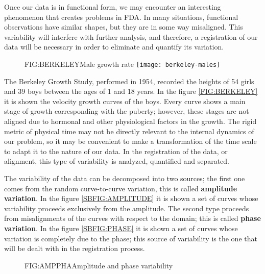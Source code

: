 Once our data is in functional form, we may encounter an interesting phenomenon
that creates problems in FDA. In many situations, functional observations have
similar shapes, but they are in some way misaligned. This variability will
interfere with further analysis, and therefore, a registration of our data will
be necessary in order to eliminate and quantify its variation.

\begin{figure}[Male growth rate]{FIG:BERKELEY}{Male growth rate}
	\texttt{[image: berkeley-males]}
\end{figure}

The Berkeley Growth Study\cite{berkeley}, performed in 1954, recorded the heights of 54
girls and 39 boys between the ages of 1 and 18 years. In the figure
\ref{FIG:BERKELEY} it is shown the velocity growth curves of the boys. Every curve shows a main stage of growth corresponding with the puberty;
however, these stages are not aligned due to hormonal and other
physiological factors in the growth. The rigid metric of physical time may not
be directly relevant to the internal dynamics of our problem, so it may be
convenient to make a transformation of the time scale to adapt it to the nature
of our data. In the registration of the data, or alignment, this type of
variability is analyzed, quantified and separated.



The variability of the data can be decomposed into two sources; the first one
comes from the random curve-to-curve variation\cite{Kokoszka2017}, this is called
\textbf{amplitude variation}. In the figure \ref{SBFIG:AMPLITUDE} it is shown a
set of curves whose variability proceeds exclusively from the amplitude. The
second type proceeds from misalignments of the curves with respect to the
domain; this is called \textbf{phase variation}. In the figure
\ref{SBFIG:PHASE} it is shown a set of curves whose variation is completely due
to the phase; this source of variability is the one that will be dealt with in
the registration process.

\begin{figure}[Amplitude and phase variability]{FIG:AMPPHA}{Amplitude and phase variability}
   \quad
\end{figure}
